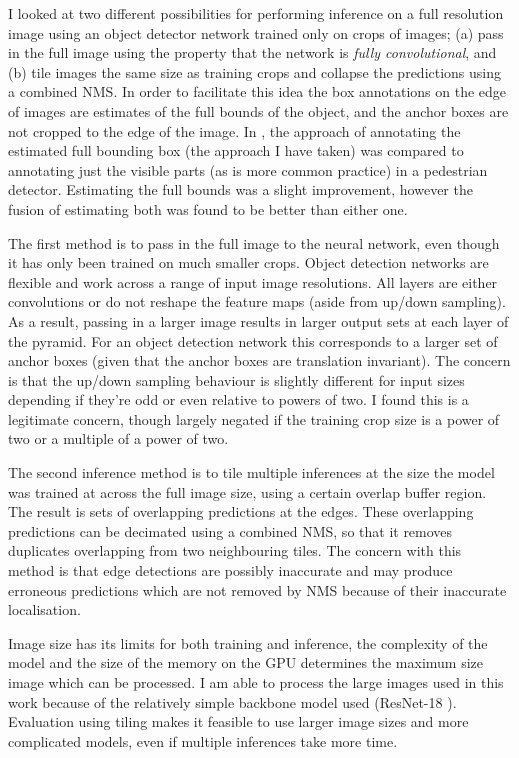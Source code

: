 I looked at two different possibilities for performing inference on a full resolution image using an object detector network trained only on crops of images; (a) pass in the full image using the property that the network is \emph{fully convolutional}, and (b) tile images the same size as training crops and collapse the predictions using a combined \gls{NMS}. In order to facilitate this idea the box annotations on the edge of images are estimates of the full bounds of the object, and the anchor boxes are not cropped to the edge of the image. In \cite{Duarte2010}, the approach of annotating the estimated full bounding box (the approach I have taken) was compared to annotating just the visible parts (as is more common practice) in a pedestrian detector. Estimating the full bounds was a slight improvement, however the fusion of estimating both was found to be better than either one. 

The first method is to pass in the full image to the neural network, even though it has only been trained on much smaller crops. Object detection networks are flexible and work across a range of input image resolutions. All layers are either convolutions or do not reshape the feature maps (aside from up/down sampling). As a result, passing in a larger image results in larger output sets at each layer of the pyramid. For an object detection network this corresponds to a larger set of anchor boxes (given that the anchor boxes are translation invariant). The concern is that the up/down sampling behaviour is slightly different for input sizes depending if they're odd or even relative to powers of two. I found this is a legitimate concern, though largely negated if the training crop size is a power of two or a multiple of a power of two. 

The second inference method is to tile multiple inferences at the size the model was trained at across the full image size, using a certain overlap buffer region. The result is sets of overlapping predictions at the edges. These overlapping predictions can be decimated using a combined \gls{NMS}, so that it removes duplicates overlapping from two neighbouring tiles. The concern with this method is that edge detections are possibly inaccurate and may produce erroneous predictions which are not removed by \gls{NMS} because of their inaccurate localisation. 

Image size has its limits for both training and inference, the complexity of the model and the size of the memory on the \gls{GPU} determines the maximum size image which can be processed. I am able to process the large images used in this work because of the relatively simple backbone model used (ResNet-18 \cite{He}). Evaluation using tiling makes it feasible to use larger image sizes and more complicated models, even if multiple inferences take more time.



